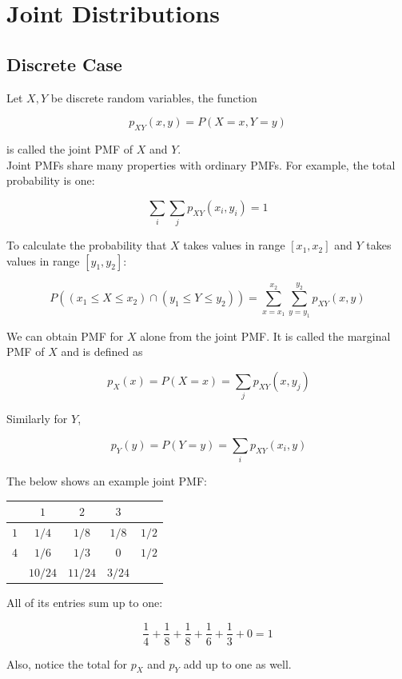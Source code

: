 \section{Joint Distributions}

\subsection{Discrete Case}

Let $X,Y$ be discrete random variables, the function

\[ p_{XY}(x,y)=P(X=x,Y=y) \]

is called the joint PMF of $X$ and $Y$. \\

Joint PMFs share many properties with ordinary PMFs. For example, the total probability is one:

\[ \sum_i \sum_j p_{XY}(x_i,y_i) = 1 \]

To calculate the probability that $X$ takes values in range $[x_1, x_2]$ and $Y$ takes values in range $[y_1, y_2]$:

\[ P((x_1\le X\le x_2) \cap (y_1\le Y\le y_2)) = \sum_{x=x_1}^{x_2} \sum_{y=y_1}^{y_2} p_{XY}(x,y) \]

We can obtain PMF for $X$ alone from the joint PMF. It is called the marginal PMF of $X$ and is defined as

\[\ p_X(x)=P(X=x)=\sum_j p_{XY}(x,y_j) \]

Similarly for $Y$,

\[\ p_Y(y)=P(Y=y)=\sum_i p_{XY}(x_i,y) \]

The below shows an example joint PMF:

\begin{center}
	\begin{tabular}{|c|c|c|c|c|}
		\hline
		\diagbox{$Y$}{$X$} & $1$ & $2$ & $3$ & \\
		\hline
		$1$ & $1/4$ & $1/8$ & $1/8$ & $1/2$ \\
		\hline
		$4$ & $1/6$ & $1/3$ & $0$ & $1/2$ \\
		\hline
		& $10/24$ & $11/24$ & $3/24$ & \diagbox{$p_X$}{$p_Y$} \\
		\hline
	\end{tabular}
\end{center}

All of its entries sum up to one:

\[\frac14+\frac18+\frac18+\frac16+\frac13+0=1\]

Also, notice the total for $p_X$ and $p_Y$ add up to one as well.

